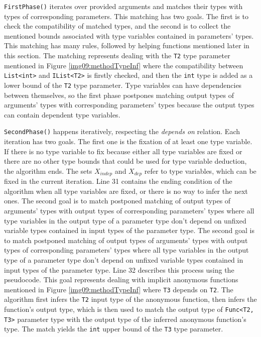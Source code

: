 \par
\texttt{FirstPhase()} iterates over provided arguments and matches their types with types of corresponding parameters. 
This matching has two goals. 
The first is to check the compatibility of matched types, and the second is to collect the mentioned bounds associated with type variables contained in parameters’ types. 
This matching has many rules, followed by helping functions mentioned later in this section.
The matching represents dealing with the \texttt{T2} type parameter mentioned in Figure \ref{img09:methodTypeInf} where the compatibility between \texttt{List<int>} and \texttt{IList<T2>} is firstly checked, and then the \texttt{int} type is added as a lower bound of the \texttt{T2} type parameter. 
Type variables can have dependencies between themselves, so the first phase postpones matching output types of arguments’ types with corresponding parameters’ types because the output types can contain dependent type variables.
\par
\texttt{SecondPhase()} happens iteratively, respecting the \textit{depends on} relation.
Each iteration has two goals.
The first one is the fixation of at least one type variable.
If there is no type variable to fix because either all type variables are fixed or there are no other type bounds that could be used for type variable deduction, the algorithm ends.
The sets \texttt{$X_{indep}$} and \texttt{$X_{dep}$} refer to type variables, which can be fixed in the current iteration.
Line 31 contains the ending condition of the algorithm when all type variables are fixed, or there is no way to infer the next ones.
The second goal is to match postponed matching of output types of arguments' types with output types of corresponding parameters' types where all type variables in the output type of a parameter type don't depend on unfixed variable types contained in input types of the parameter type.
The second goal is to match postponed matching of output types of arguments' types with output types of corresponding parameters' types where all type variables in the output type of a parameter type don't depend on unfixed variable types contained in input types of the parameter type.
Line 32 describes this process using the pseudocode.
This goal represents dealing with implicit anonymous functions mentioned in Figure \ref{img09:methodTypeInf} where \texttt{T3} depends on \texttt{T2}.
The algorithm first infers the \texttt{T2} input type of the anonymous function, then infers the function's output type, which is then used to match the output type of \texttt{Func<T2, T3>} parameter type with the output type of the inferred anonymous function's type.
The match yields the \texttt{int} upper bound of the \texttt{T3} type parameter.

